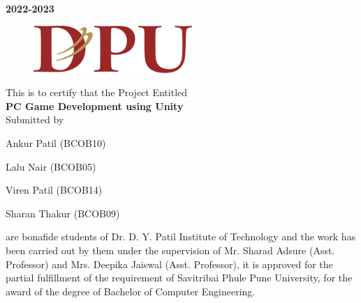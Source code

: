\documentclass[12pt]{report}
\begin{document}
\large \textbf  {2022-2023}\\
\vspace{0.25 cm}
\thispagestyle{empty}
\clearpage


\begin{figure}[h]
\centering
\includegraphics[width=6cm]{Logo.png}
\end{figure}

\vspace{0.3 cm}

\vspace{0.4 cm}

\normalsize{This is to certify that the Project Entitled}\\
\vspace{0.3cm}
\large\textbf{PC Game Development using Unity}\\
\vspace{0.3 cm}
\normalsize{Submitted by}\\
\vspace{0.3 cm}

\normalsize  {Ankur Patil (BCOB10)}

\normalsize  {Lalu Nair (BCOB05)}

\normalsize  {Viren Patil (BCOB14)}

\normalsize  {Sharan Thakur (BCOB09)}

\justifying
\setlength{\parindent}{4em}
\setlength{\parskip}{1em}
\renewcommand{\baselinestretch}{1.5}
\normalsize
are bonafide students of Dr. D. Y. Patil Institute of Technology and the work has been carried 
out by them under the supervision of Mr. Sharad Adsure (Asst. Professor) and Mrs. 
Deepika Jaiswal (Asst. Professor), it is approved for the partial fulfillment of the 
requirement of Savitribai Phule Pune University, for the award of the degree of Bachelor of Computer
Engineering.
\vspace{0.05 cm}
\linebreak
\end{document}
